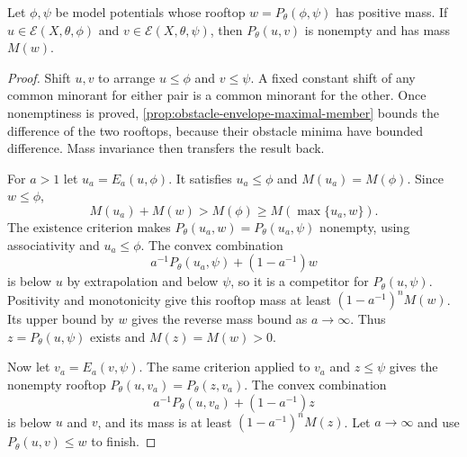 \begin{proposition}\label{prop:rooftop-full-mass-substitution}
Let $\phi,\psi$ be model potentials whose rooftop $w=P_\theta(\phi,\psi)$ has positive mass. If $u\in\mathcal E(X,\theta,\phi)$ and $v\in\mathcal E(X,\theta,\psi)$, then $P_\theta(u,v)$ is nonempty and has mass $M(w)$.
\end{proposition}
\begin{proof}
Shift $u,v$ to arrange $u\leq\phi$ and $v\leq\psi$. A fixed constant shift of any common minorant for either pair is a common minorant for the other. Once nonemptiness is proved, \cref{prop:obstacle-envelope-maximal-member} bounds the difference of the two rooftops, because their obstacle minima have bounded difference. Mass invariance then transfers the result back.

For $a>1$ let $u_a=E_a(u,\phi)$. It satisfies $u_a\leq\phi$ and $M(u_a)=M(\phi)$. Since $w\leq\phi$,
\[
 M(u_a)+M(w)>M(\phi)\geq M(\max\{u_a,w\}).
\]
The existence criterion makes $P_\theta(u_a,w)=P_\theta(u_a,\psi)$ nonempty, using associativity and $u_a\leq\phi$. The convex combination
\[
 a^{-1}P_\theta(u_a,\psi)+(1-a^{-1})w
\]
is below $u$ by extrapolation and below $\psi$, so it is a competitor for $P_\theta(u,\psi)$. Positivity and monotonicity give this rooftop mass at least $(1-a^{-1})^nM(w)$. Its upper bound by $w$ gives the reverse mass bound as $a\to\infty$. Thus $z=P_\theta(u,\psi)$ exists and $M(z)=M(w)>0$.

Now let $v_a=E_a(v,\psi)$. The same criterion applied to $v_a$ and $z\leq\psi$ gives the nonempty rooftop $P_\theta(u,v_a)=P_\theta(z,v_a)$. The convex combination
\[
 a^{-1}P_\theta(u,v_a)+(1-a^{-1})z
\]
is below $u$ and $v$, and its mass is at least $(1-a^{-1})^nM(z)$. Let $a\to\infty$ and use $P_\theta(u,v)\leq w$ to finish.
\end{proof}

